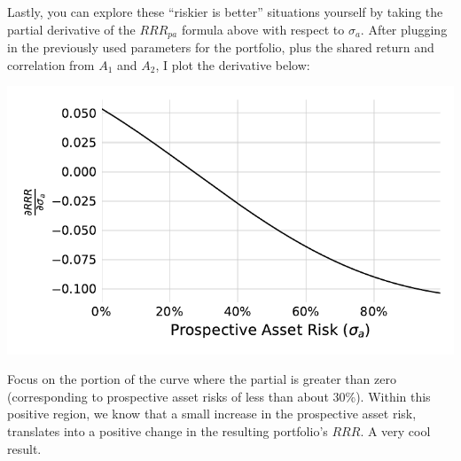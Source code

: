 \documentclass[]{article}
\begin{document}
Lastly, you can explore these ``riskier is better'' situations yourself
by taking the partial derivative of the \(RRR_{pa}\) formula above with
respect to \(\sigma_a\). After plugging in the previously used
parameters for the portfolio, plus the shared return and correlation
from \(A_1\) and \(A_2\), I plot the derivative below:

\begin{center}\includegraphics{paper_files/figure-latex/Partial-1} \end{center}

Focus on the portion of the curve where the partial is greater than zero
(corresponding to prospective asset risks of less than about 30\%).
Within this positive region, we know that a small increase in the
prospective asset risk, translates into a positive change in the
resulting portfolio's \(RRR\). A very cool result.
\end{document}
